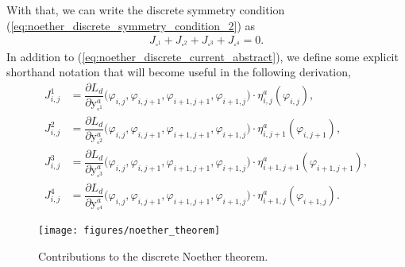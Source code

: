 \documentclass[12pt,a4paper,reqno]{article}
\begin{document}
With that, we can write the discrete symmetry condition (\ref{eq:noether_discrete_symmetry_condition_2}) as
\begin{align}\label{eq:noether_discrete_symmetry_condition_3}
J_{\square^{1}} + J_{\square^{2}} + J_{\square^{3}} + J_{\square^{4}} = 0 .
\end{align}
In addition to (\ref{eq:noether_discrete_current_abstract}), we define some explicit shorthand notation that will become useful in the following derivation,
\begingroup
\allowdisplaybreaks
\begin{subequations}\label{eq:noether_discrete_current_shorthand}
\begin{align}
J_{i,j}^{1} &= \dfrac{\partial L_d}{\partial {\ensuremath{{\ensuremath{\mathrm{{y}}}}}}^{a}_{\square^1}} \Big( {\ensuremath{\varphi}}_{i,  j  }, {\ensuremath{\varphi}}_{i,  j+1}, {\ensuremath{\varphi}}_{i+1,j+1}, {\ensuremath{\varphi}}_{i+1,j  } \Big) \cdot \eta^{a}_{i,  j  } ( {\ensuremath{\varphi}}_{i,  j  } ),
\\
J_{i,j}^{2} &= \dfrac{\partial L_d}{\partial {\ensuremath{{\ensuremath{\mathrm{{y}}}}}}^{a}_{\square^2}} \Big( {\ensuremath{\varphi}}_{i,  j  }, {\ensuremath{\varphi}}_{i,  j+1}, {\ensuremath{\varphi}}_{i+1,j+1}, {\ensuremath{\varphi}}_{i+1,j  } \Big) \cdot \eta^{a}_{i,  j+1} ( {\ensuremath{\varphi}}_{i,  j+1} ) ,
\\
J_{i,j}^{3} &= \dfrac{\partial L_d}{\partial {\ensuremath{{\ensuremath{\mathrm{{y}}}}}}^{a}_{\square^3}} \Big( {\ensuremath{\varphi}}_{i,  j  }, {\ensuremath{\varphi}}_{i,  j+1}, {\ensuremath{\varphi}}_{i+1,j+1}, {\ensuremath{\varphi}}_{i+1,j  } \Big) \cdot \eta^{a}_{i+1,j+1} ( {\ensuremath{\varphi}}_{i+1,j+1} ) ,
\\
J_{i,j}^{4} &= \dfrac{\partial L_d}{\partial {\ensuremath{{\ensuremath{\mathrm{{y}}}}}}^{a}_{\square^4}} \Big( {\ensuremath{\varphi}}_{i,  j  }, {\ensuremath{\varphi}}_{i,  j+1}, {\ensuremath{\varphi}}_{i+1,j+1}, {\ensuremath{\varphi}}_{i+1,j  } \Big) \cdot \eta^{a}_{i+1,j  } ( {\ensuremath{\varphi}}_{i+1,j  } ).
\end{align}
\end{subequations}
\endgroup

\begin{figure}[tb]
	\centering
	\texttt{[image: figures/noether\_theorem]}
	\caption{Contributions to the discrete Noether theorem.}
	\label{fig:discrete_noether_theorem}
\end{figure}
\end{document}
